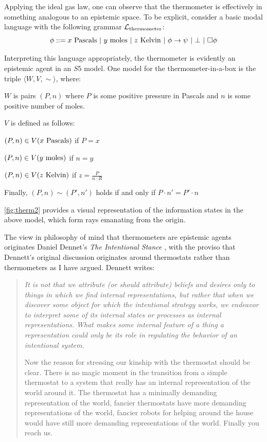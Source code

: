 \documentclass[11pt]{article}
\numberwithin{equation}{subsection}
\begin{document}
Applying the ideal gas law, one can observe that the thermometer is effectively
in something analogous to an epistemic space.  To be explicit,
consider a basic modal language with the following grammar $\mathcal{L}_{\textup{thermometer}}$:
\[ \phi ::= x \textup{ Pascals}  \ |\ y \textup{ moles}  \ |\ z \textup{ Kelvin}  \ |\ \phi \to \psi \ |\ \bot \ |\ \Box \phi \]

Interpreting this language appropriately, the
thermometer is evidently an epistemic agent in an $S5$ model.
One model for the thermometer-in-a-box is the triple $\langle W, V, \sim \rangle$,
where:
\begin{bul}
	\item $W$ is pairs $(P,n)$ where $P$ is some positive pressure
          in Pascals and $n$ is some positive number of moles.
	\item $V$ is defined as follows:
	\begin{bul}
		\item $(P,n) \in V(x \textup{\ Pascals})$ if $P = x$
		\item $(P,n) \in V(y \textup{\ moles})$ if $n = y$
		\item $(P,n) \in V(z \textup{\ Kelvin})$ if $z = \frac{P}{n \cdot R}$
	\end{bul}
	\item Finally, $(P,n) \sim (P',n')$ holds if and only if $P \cdot n' = P' \cdot n$ 
\end{bul}
\ref{fig:therm2} provides a visual representation of the information
states in the above model, which form rays emanating from the origin.

The view in philosophy of mind that thermometers are epistemic agents 
originates Daniel Dennet's \emph{The Intentional Stance}
\citep{dennett_intentional_1998}, 
with the proviso that Dennett's
original discussion originates around thermostats rather than 
thermometers as I have argued.  Dennett writes:
\begin{quote}
\emph{It is not that we attribute (or should attribute) beliefs and desires only to
things in which we find internal representations, but rather that when we
discover some object for which the intentional strategy works, we endeavor to
interpret some of its internal states or processes as internal representations.
What makes some internal feature of a thing a representation could only be its
role in regulating the behavior of an intentional system.}

Now the reason for stressing our kinship with the thermostat
should be clear. There is no magic moment in the transition from a
simple thermostat to a system that really has an internal representation
of the world around it. The thermostat has a minimally demanding
representation of the world, fancier thermostats have more demanding 
representations of the world, fancier robots for helping around
the house would have still more demanding representations of the
world. Finally you reach us.
\end{quote}
\end{document}

